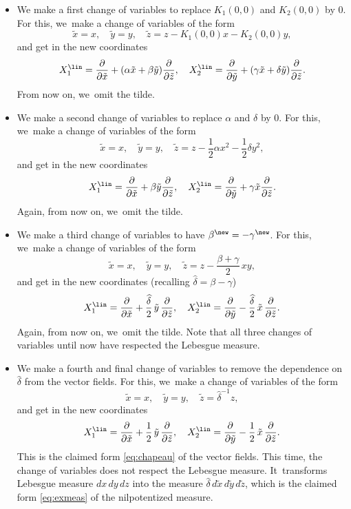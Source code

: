 \begin{itemize}
\item We make a first change of variables to replace $K_1(0,0)$ and $K_2(0,0)$ by $0$.
For this, we~make a change of variables of the form
\[
\tilde x = x,\quad
\tilde y =y,\quad \tilde z = z - K_1(0,0) x - K_2(0,0) y,
\]
and get in the new coordinates
\[
X_1^\lin= \frac{\partial}{\partial \tilde x} + (\alpha \tilde x + \beta \tilde y) \frac{\partial}{\partial \tilde z},\quad
X_2^\lin= \frac{\partial}{\partial \tilde y} +(\gamma \tilde x + \delta \tilde y) \frac{\partial}{\partial \tilde z}.
\]
From now on, we~omit the tilde.
\item We make a second change of variables to replace $\alpha$ and $\delta$ by $0$.
For this, we~make a change of variables of the form
\[
\tilde x = x,\quad \tilde y =y,\quad \tilde z = z - \frac 12 \alpha x^2 - \frac 12 \delta y^2,
\]
and get in the new coordinates
\[
X_1^\lin= \frac{\partial}{\partial \tilde x} + \beta \tilde y \frac{\partial}{\partial \tilde z},\quad
X_2^\lin= \frac{\partial}{\partial \tilde y} + \gamma \tilde x \frac{\partial}{\partial \tilde z}.
\]
Again, from now on, we~omit the tilde.
\item We make a third change of variables to have $\beta^\new = - \gamma^\new$.
For this, we~make a change of variables of the form
\[
\tilde x = x,\quad \tilde y =y,\quad \tilde z = z - \frac{\beta+\gamma}2\,xy,
\]
and get in the new coordinates (recalling $\widehat\delta = \beta - \gamma$)
\[
X_1^\lin= \frac{\partial}{\partial \tilde x} + \frac{\widehat\delta}{2}\,\tilde y\,\frac{\partial}{\partial \tilde z},\quad
X_2^\lin= \frac{\partial}{\partial \tilde y} - \frac{\widehat\delta}{2}\,\tilde x\,\frac{\partial}{\partial \tilde z}.
\]
Again, from now on, we~omit the tilde.
Note that all three changes of variables until now have respected the Lebesgue measure.
\item We make a fourth and final change of variables to remove the dependence on $\widehat\delta$ from the vector fields.
For this, we~make a change of variables of the form
\[
\tilde x = x,\quad \tilde y =y,\quad \tilde z = \widehat \delta^{-1} z,
\]
and get in the new coordinates
\[
X_1^\lin= \frac{\partial}{\partial \tilde x} + \frac{1}{2}\,\tilde y\,\frac{\partial}{\partial \tilde z},\quad
X_2^\lin= \frac{\partial}{\partial \tilde y} - \frac{1}{2}\,\tilde x\,\frac{\partial}{\partial \tilde z}.
\]
This is the claimed form \eqref{eq:chapeau} of the vector fields.
This time, the change of variables does not respect the Lebesgue measure. It~transforms Lebesgue measure $dx\,dy\,dz$ into the measure $\widehat\delta\,d\tilde x\,d\tilde y\,d\tilde z$, which is the claimed form \eqref{eq:exmeas} of the nilpotentized measure.
\end{itemize}

